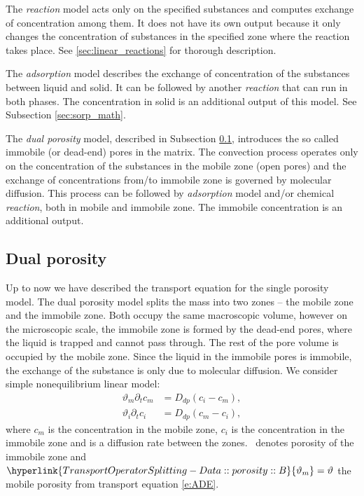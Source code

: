 The \emph{reaction} model acts only on the specified substances and computes exchange of concentration 
among them. It does not have its own output because it only changes the concentration of substances 
in the specified zone where the reaction takes place. See \ref{sec:linear_reactions} for thorough description.

The \emph{adsorption} model describes the exchange of concentration of the substances between liquid and solid. It can be
followed by another \emph{reaction} that can run in both phases. The concentration in solid is an additional output 
of this model. See Subsection \ref{sec:sorp_math}.


The \emph{dual porosity} model, described in Subsection \ref{sec:dual_porosity}, introduces the so called immobile (or dead-end) pores in the matrix. The convection process operates only on the concentration of the substances in the mobile zone (open pores) 
and the exchange of concentrations from/to immobile zone is governed by molecular diffusion. This process can be followed by 
\emph{adsorption} model and/or chemical \emph{reaction}, both in mobile and immobile zone. The immobile concentration is an
additional output.


\subsection{Dual porosity}
\label{sec:dual_porosity}

Up to now we have described the transport equation for the single porosity model. The dual porosity model splits the mass into 
two zones -- the mobile zone and the immobile zone. Both occupy the same macroscopic volume, however on the microscopic scale, 
the immobile zone is formed by the dead-end pores, where the liquid is trapped and cannot pass through. The rest of the pore volume 
is occupied by the mobile zone. Since the liquid in the immobile pores is immobile, the exchange of the substance is only due 
to molecular diffusion. We consider simple nonequilibrium linear model:
\begin{align}
    \vartheta_m \partial_t c_m &= D_{dp} ( c_i - c_m), \label{eqn:dual_porosity_ode1}\\
    \vartheta_i \partial_t c_i &= D_{dp} ( c_m - c_i), \label{eqn:dual_porosity_ode2}
\end{align}
where $c_m$ is the concentration in the mobile zone, $c_i$ is the concentration in the immobile zone and
 is a diffusion rate between the zones.
~denotes porosity of the immobile zone  and 
$\hyperlink{TransportOperatorSplitting-Data::porosity::B}{\vartheta_m} = \vartheta$ the mobile porosity from transport equation \eqref{e:ADE}.

